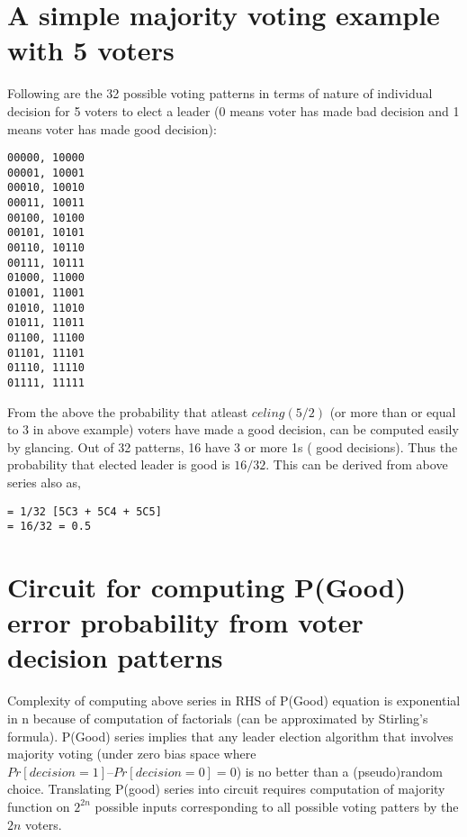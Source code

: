 \documentclass[11pt,onecolumn]{article}
\begin{document}
\section{A simple majority voting example with 5 voters}
Following are the 32 possible voting patterns in terms of nature of individual decision for 5 voters
to elect a leader (0 means voter has made bad decision and 1 means voter has made good decision):
\begin{verbatim}
00000, 10000
00001, 10001
00010, 10010
00011, 10011
00100, 10100
00101, 10101
00110, 10110
00111, 10111
01000, 11000
01001, 11001
01010, 11010
01011, 11011
01100, 11100
01101, 11101
01110, 11110
01111, 11111
\end{verbatim}
From the above the probability that atleast $celing(5/2)$ (or more than or equal to 3 in above
example) voters have made a good decision, can be computed easily by glancing. Out of 32
patterns, 16 have 3 or more 1s ( good decisions). Thus the probability that elected leader is good
is $16/32$. This can be derived from above series also as,
\begin{verbatim}
= 1/32 [5C3 + 5C4 + 5C5]
= 16/32 = 0.5
\end{verbatim}

\section{Circuit for computing P(Good) error probability from voter decision patterns}
Complexity of computing above series in RHS of P(Good) equation is exponential in n because of
computation of factorials (can be approximated by Stirling's formula). P(Good) series implies
that any leader election algorithm that involves majority voting (under zero bias space where
$Pr[decision=1] – Pr[decision=0] = 0$) is no better than a (pseudo)random choice.
Translating P(good) series into circuit requires computation of majority function on $2^{2n}$
possible inputs corresponding to all possible voting patters by the $2n$ voters.
\end{document}
